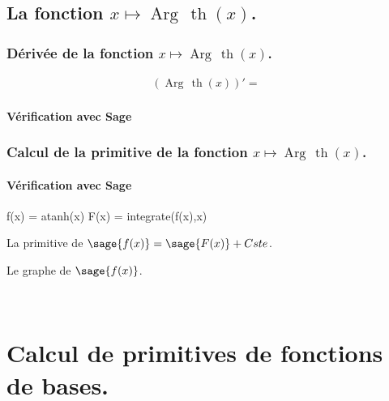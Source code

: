 \documentclass[a4paper,14pt]{extreport} %
\renewcommand{\tanh}{\mathop{\mathrm{th}}}
\renewcommand{\arg}{\mathop{\mathrm{Arg\,}}}
\begin{document}
\section{La fonction  $x \mapsto \arg \tanh(x)$.}




\subsection{Dérivée de la fonction $x \mapsto \arg \tanh(x)$.}

\begin{align*}
(\arg \tanh(x))' = &
\end{align*}


\subsubsection{Vérification avec Sage}



\subsection{Calcul de la primitive de la fonction  $x \mapsto \arg \tanh(x)$.}




\subsubsection{Vérification avec Sage}

\begin{sageblock}
    f(x) = atanh(x)
    F(x) = integrate(f(x),x)
\end{sageblock}


La primitive de $\sage{f(x)} = \sage{F(x)} + Cste $.



Le graphe de $\sage{f(x)} $.


\begin{center}
 \\
\end{center}








\chapter{Calcul de primitives de fonctions de bases.}
\end{document}
